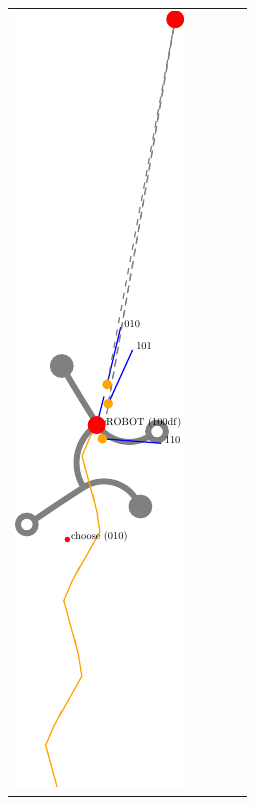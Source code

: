 \documentclass[10pt,a4paper]{article}
\begin{document}
\begin{tabular}{ccccc}
\includegraphics[scale=.8]{pics/pathplanner_without_noise/example_straight/dec_47.pdf}
&

\end{tabular}
\end{document}
